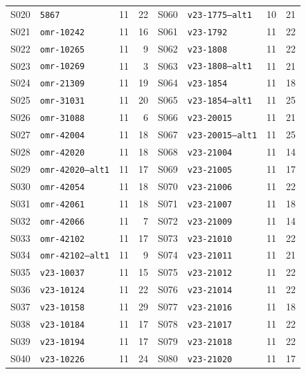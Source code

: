 \begin{table}[p]
\begin{tabular}{@{}llrr@{\qquad}llrr@{}}
S020 & \texttt{5867} & 11 & 22 & S060 & \texttt{v23-1775--alt1} & 10 & 21\\
S021 & \texttt{omr-10242} & 11 & 16 & S061 & \texttt{v23-1792} & 11 & 22\\
S022 & \texttt{omr-10265} & 11 & 9 & S062 & \texttt{v23-1808} & 11 & 22\\
S023 & \texttt{omr-10269} & 11 & 3 & S063 & \texttt{v23-1808--alt1} & 11 & 21\\
S024 & \texttt{omr-21309} & 11 & 19 & S064 & \texttt{v23-1854} & 11 & 18\\
S025 & \texttt{omr-31031} & 11 & 20 & S065 & \texttt{v23-1854--alt1} & 11 & 25\\
S026 & \texttt{omr-31088} & 11 & 6 & S066 & \texttt{v23-20015} & 11 & 21\\
S027 & \texttt{omr-42004} & 11 & 18 & S067 & \texttt{v23-20015--alt1} & 11 & 25\\
S028 & \texttt{omr-42020} & 11 & 18 & S068 & \texttt{v23-21004} & 11 & 14\\
S029 & \texttt{omr-42020--alt1} & 11 & 17 & S069 & \texttt{v23-21005} & 11 & 17\\
S030 & \texttt{omr-42054} & 11 & 18 & S070 & \texttt{v23-21006} & 11 & 22\\
S031 & \texttt{omr-42061} & 11 & 18 & S071 & \texttt{v23-21007} & 11 & 18\\
S032 & \texttt{omr-42066} & 11 & 7 & S072 & \texttt{v23-21009} & 11 & 14\\
S033 & \texttt{omr-42102} & 11 & 17 & S073 & \texttt{v23-21010} & 11 & 22\\
S034 & \texttt{omr-42102--alt1} & 11 & 9 & S074 & \texttt{v23-21011} & 11 & 21\\
S035 & \texttt{v23-10037} & 11 & 15 & S075 & \texttt{v23-21012} & 11 & 22\\
S036 & \texttt{v23-10124} & 11 & 22 & S076 & \texttt{v23-21014} & 11 & 22\\
S037 & \texttt{v23-10158} & 11 & 29 & S077 & \texttt{v23-21016} & 11 & 18\\
S038 & \texttt{v23-10184} & 11 & 17 & S078 & \texttt{v23-21017} & 11 & 22\\
S039 & \texttt{v23-10194} & 11 & 17 & S079 & \texttt{v23-21018} & 11 & 22\\
S040 & \texttt{v23-10226} & 11 & 24 & S080 & \texttt{v23-21020} & 11 & 17\\
\bottomrule
\end{tabular}
\end{table}
